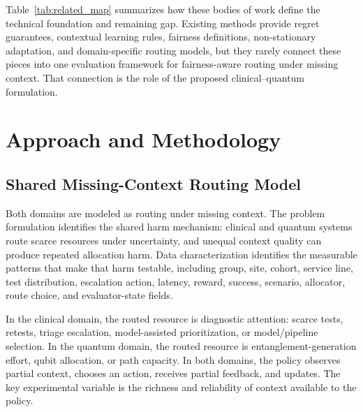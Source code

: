 \documentclass[conference]{IEEEtran}
\begin{document}
Table~\ref{tab:related_map} summarizes how these bodies of work define the
technical foundation and remaining gap. Existing methods provide regret
guarantees, contextual learning rules, fairness definitions, non-stationary
adaptation, and domain-specific routing models, but they rarely connect these
pieces into one evaluation framework for fairness-aware routing under missing
context. That connection is the role of the proposed clinical--quantum
formulation.

\section{Approach and Methodology}
\subsection{Shared Missing-Context Routing Model}
Both domains are modeled as routing under missing context. The problem
formulation identifies the shared harm mechanism: clinical and quantum systems
route scarce resources under uncertainty, and unequal context quality can
produce repeated allocation harm. Data characterization identifies the
measurable patterns that make that harm testable, including group, site,
cohort, service line, test distribution, escalation action, latency, reward,
success, scenario, allocator, route choice, and evaluator-state fields.

In the clinical domain, the routed resource is diagnostic attention: scarce
tests, retests, triage escalation, model-assisted prioritization, or
model/pipeline selection. In the quantum domain, the routed resource is
entanglement-generation effort, qubit allocation, or path capacity. In both
domains, the policy observes partial context, chooses an action, receives
partial feedback, and updates. The key experimental variable is the richness
and reliability of context available to the policy.
\end{document}
